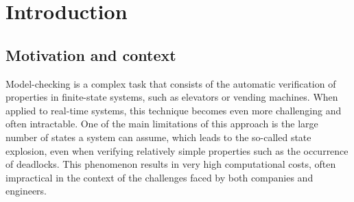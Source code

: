 \chapter{Introduction}

\section{Motivation and context}



Model-checking is a complex task that consists of the automatic verification of properties in finite-state systems, such as elevators or vending machines. When applied to real-time systems, this technique becomes even more challenging and often intractable. One of the main limitations of this approach is the large number of states a system can assume, which leads to the so-called state explosion, even when verifying relatively simple properties such as the occurrence of deadlocks. This phenomenon results in very high computational costs, often impractical in the context of the challenges faced by both companies and engineers.

